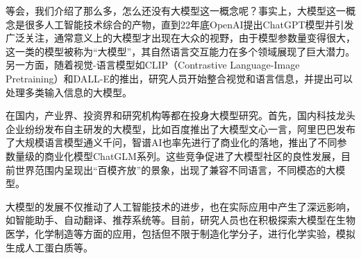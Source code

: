 等会，我们介绍了那么多，怎么还没有大模型这一概念呢？事实上，大模型这一概念是很多人工智能技术综合的产物，直到22年底OpenAI提出ChatGPT模型并引发广泛关注，通常意义上的大模型才出现在大众的视野，由于模型参数量变得很大，这一类的模型被称为“大模型”，其自然语言交互能力在多个领域展现了巨大潜力。另一方面，随着视觉-语言模型如CLIP（Contrastive Language-Image Pretraining）和DALL-E的推出，研究人员开始整合视觉和语言信息，并提出可以处理多类输入信息的大模型。

在国内，产业界、投资界和研究机构等都在投身大模型研究。首先，国内科技龙头企业纷纷发布自主研发的大模型，比如百度推出了大模型文心一言，阿里巴巴发布了大规模语言模型通义千问，智谱AI也率先进行了商业化的落地，推出了不同参数量级的商业化模型ChatGLM系列。这些竞争促进了大模型社区的良性发展，目前世界范围内呈现出“百模齐放”的景象，出现了兼容不同语言，不同模态的大模型。

大模型的发展不仅推动了人工智能技术的进步，也在实际应用中产生了深远影响，如智能助手、自动翻译、推荐系统等。目前，研究人员也在积极探索大模型在生物医学，化学制造等方面的应用，包括但不限于制造化学分子，进行化学实验，模拟生成人工蛋白质等。
